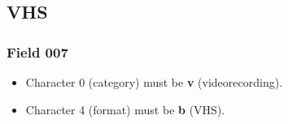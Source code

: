 \documentclass[a4paper,10pt]{amsart}
\begin{document}
\subsection{VHS}
\subsubsection*{Field 007}
\begin{itemize}
 \item Character 0 (category) must be {\bf v} (videorecording).
 \item Character 4 (format) must be {\bf b} (VHS).
\end{itemize}
\end{document}
